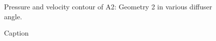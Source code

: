 \begin{figure}[htb!]
    \noindent{}
    \caption{Pressure and velocity contour of A2: Geometry 2 in various diffuser angle.}
    \label{fig:2D_OF_A2_CONTOUR}
\end{figure}


\begin{figure}[!htb]
    \noindent{}  
    \caption{Caption}
    \label{fig:2D_OF_A3_Contour}
\end{figure}

